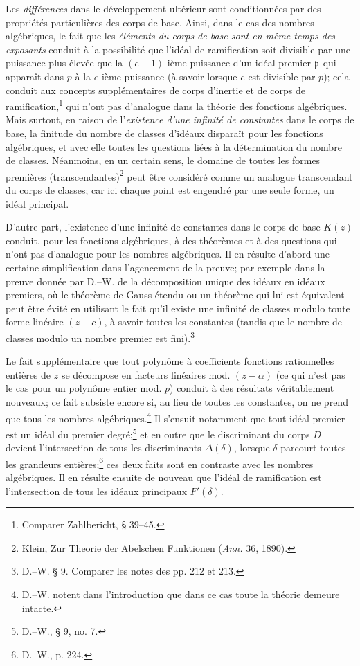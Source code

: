 Les \emph{différences} dans le développement ultérieur sont conditionnées par des propriétés particulières des corps de base. Ainsi, dans le cas des nombres algébriques, le fait que les \emph{éléments du corps de base sont en même temps des exposants} conduit à la possibilité que l'idéal de ramification soit divisible par une puissance plus élevée que la \((e-1)\)-ième puissance d'un idéal premier \(\mathfrak p\) qui apparaît dans \(p\) à la \(e\)-ième puissance (à savoir lorsque \(e\) est divisible par \(p\)); cela conduit aux concepts supplémentaires de corps d'inertie et de corps de ramification,\footnote{Comparer Zahlbericht, \S{} 39--45.} qui n'ont pas d'analogue dans la théorie des fonctions algébriques. Mais surtout, en raison de l'\emph{existence d'une infinité de constantes} dans le corps de base, la finitude du nombre de classes d'idéaux disparaît pour les fonctions algébriques, et avec elle toutes les questions liées à la détermination du nombre de classes. Néanmoins, en un certain sens, le domaine de toutes les formes premières (transcendantes)\footnote{Klein, Zur Theorie der Abelschen Funktionen (\emph{Ann.} 36, 1890).} peut être considéré comme un analogue transcendant du corps de classes; car ici chaque point est engendré par une seule forme, un idéal principal.

D'autre part, l'existence d'une infinité de constantes dans le corps de base \(K(z)\) conduit, pour les fonctions algébriques, à des théorèmes et à des questions qui n'ont pas d'analogue pour les nombres algébriques. Il en résulte d'abord une certaine simplification dans l'agencement de la preuve; par exemple dans la preuve donnée par D.--W. de la décomposition unique des idéaux en idéaux premiers, où le \og{}théorème de Gauss étendu\fg{} ou un théorème qui lui est équivalent peut être évité en utilisant le fait qu'il existe une infinité de classes modulo toute forme linéaire \((z-c)\), à savoir toutes les constantes (tandis que le nombre de classes modulo un nombre premier est fini).\footnote{D.--W. \S{} 9. Comparer les notes des pp. 212 et 213.}

Le fait supplémentaire que tout polynôme à coefficients fonctions rationnelles entières de \(z\) se décompose en facteurs linéaires mod. \((z-\alpha)\) (ce qui n'est pas le cas pour un polynôme entier mod. \(p\)) conduit à des résultats véritablement nouveaux; ce fait subsiste encore si, au lieu de toutes les constantes, on ne prend que tous les nombres algébriques.\footnote{D.--W. notent dans l'introduction que dans ce cas toute la théorie demeure intacte.} Il s'ensuit notamment que tout idéal premier est un idéal du premier degré;\footnote{D.--W., \S{} 9, no. 7.} et en outre que le discriminant du corps \(D\) devient l'intersection de tous les discriminants \(\Delta(\delta)\), lorsque \(\delta\) parcourt toutes les grandeurs entières;\footnote{D.--W., p. 224.} ces deux faits sont en contraste avec les nombres algébriques. Il en résulte ensuite de nouveau que l'idéal de ramification est l'intersection de tous les idéaux principaux \(F'(\delta)\).

